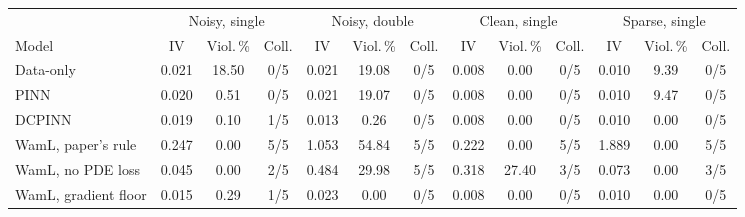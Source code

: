 \begin{tabular}{lcccccccccccc}
\toprule
 & \multicolumn{3}{c}{Noisy, single} & \multicolumn{3}{c}{Noisy, double} & \multicolumn{3}{c}{Clean, single} & \multicolumn{3}{c}{Sparse, single}\\
\cmidrule(lr){2-4}\cmidrule(lr){5-7}\cmidrule(lr){8-10}\cmidrule(lr){11-13}
Model & IV & Viol.\,\% & Coll. & IV & Viol.\,\% & Coll. & IV & Viol.\,\% & Coll. & IV & Viol.\,\% & Coll.\\
\midrule
Data-only & 0.021 & 18.50 & 0/5 & 0.021 & 19.08 & 0/5 & 0.008 & 0.00 & 0/5 & 0.010 & 9.39 & 0/5\\
PINN & 0.020 & 0.51 & 0/5 & 0.021 & 19.07 & 0/5 & 0.008 & 0.00 & 0/5 & 0.010 & 9.47 & 0/5\\
DCPINN & 0.019 & 0.10 & 1/5 & 0.013 & 0.26 & 0/5 & 0.008 & 0.00 & 0/5 & 0.010 & 0.00 & 0/5\\
WamL, paper's rule & 0.247 & 0.00 & 5/5 & 1.053 & 54.84 & 5/5 & 0.222 & 0.00 & 5/5 & 1.889 & 0.00 & 5/5\\
WamL, no PDE loss & 0.045 & 0.00 & 2/5 & 0.484 & 29.98 & 5/5 & 0.318 & 27.40 & 3/5 & 0.073 & 0.00 & 3/5\\
WamL, gradient floor & 0.015 & 0.29 & 1/5 & 0.023 & 0.00 & 0/5 & 0.008 & 0.00 & 0/5 & 0.010 & 0.00 & 0/5\\
\bottomrule
\end{tabular}
